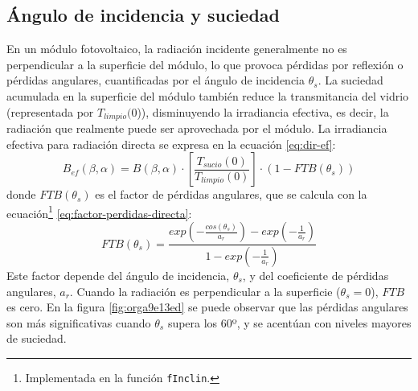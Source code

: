 \subsection{Ángulo de incidencia y suciedad}
\label{sec:orgc05b182}
\label{subsec-angulo-incidencia-suciedad}
En un módulo fotovoltaico, la radiación incidente generalmente no es perpendicular a la superficie del módulo, lo que provoca pérdidas por reflexión o pérdidas angulares, cuantificadas por el ángulo de incidencia \(\theta_s\). La suciedad acumulada en la superficie del módulo también reduce la transmitancia del vidrio (representada por \(T_{limpio}(0\))), disminuyendo la irradiancia efectiva, es decir, la radiación que realmente puede ser aprovechada por el módulo.
La irradiancia efectiva para radiación directa se expresa en la ecuación \ref{eq:dir-ef}:
\begin{equation}
B_{ef}(\beta ,\alpha)=B(\beta ,\alpha)\cdot [\frac{T_{sucio}(0)}{T_{limpio}(0)}]\cdot (1-FTB(\theta_s))
\label{eq:dir-ef}
\end{equation}
donde \(FTB(\theta_s)\) es el factor de pérdidas angulares, que se calcula con la ecuación\footnote{Implementada en la función \texttt{fInclin}.} \ref{eq:factor-perdidas-directa}: 
\begin{equation}
FTB(\theta_s)=\frac{exp(-\frac{cos(\theta_s)}{a_r})-exp(-\frac{1}{a_r})}{1-exp(-\frac{1}{a_r})}
\label{eq:factor-perdidas-directa}
\end{equation}
Este factor depende del ángulo de incidencia, \(\theta_s\), y del coeficiente de pérdidas angulares, \(a_r\). Cuando la radiación es perpendicular a la superficie (\(\theta_s=0\)), \(FTB\) es cero. En la figura \ref{fig:orga9e13ed} se puede observar que las pérdidas angulares son más significativas cuando \(\theta_s\) supera los 60º, y se acentúan con niveles mayores de suciedad.
